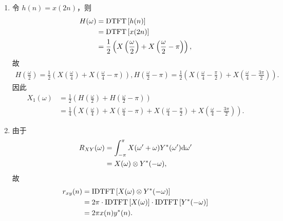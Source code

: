 \begin{solution}
    \begin{enumerate}[label=(\arabic*)]
        \item 令 $h(n) = x(2n)$，则
            \begin{align*}
                H(\omega) & = \mathrm{DTFT}\left[h(n)\right] \\
                & = \mathrm{DTFT}\left[x(2n)\right] \\
                & = \frac{1}{2}\left(X\left(\frac{\omega}{2}\right) + X\left(\frac{\omega}{2} - \pi\right)\right),
            \end{align*}
            故
            \begin{align*}
                H\left(\frac{\omega}{2}\right) = \frac{1}{2}\left(X\left(\frac{\omega}{4}\right) + X\left(\frac{\omega}{4} - \pi\right)\right),
                H\left(\frac{\omega}{2} - \pi\right) = \frac{1}{2}\left(X\left(\frac{\omega}{4} - \frac{\pi}{2}\right) + X\left(\frac{\omega}{4} - \frac{3\pi}{2}\right)\right).
            \end{align*}
            因此
            \begin{align*}
                X_1(\omega) & = \frac{1}{2}\left(H\left(\frac{\omega}{2}\right) + H\left(\frac{\omega}{2} - \pi\right)\right) \\
                & = \frac{1}{4}\left(X\left(\frac{\omega}{4}\right) + X\left(\frac{\omega}{4} - \pi\right) + X\left(\frac{\omega}{4} - \frac{\pi}{2}\right) + X\left(\frac{\omega}{4} - \frac{3\pi}{2}\right)\right).
            \end{align*}
        \item 由于
            \begin{align*}
                R_{XY}(\omega) & = \int_{-\pi}^{\pi}X(\omega' + \omega)Y^*(\omega')\mathrm{d}\omega' \\
                & = X(\omega) \otimes Y^*(-\omega),
            \end{align*}
            故
            \begin{align*}
                r_{xy}(n) & = \mathrm{IDTFT}\left[X(\omega) \otimes Y^*(-\omega)\right] \\
                & = 2\pi \cdot \mathrm{IDTFT}\left[X(\omega)\right] \cdot \mathrm{IDTFT}\left[Y^*(-\omega)\right] \\
                & = 2\pi x(n)y^*(n).
            \end{align*}
    \end{enumerate}
\end{solution}

